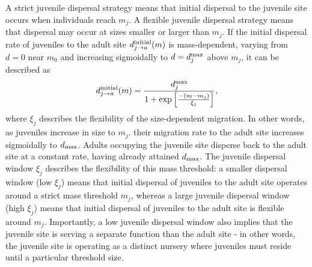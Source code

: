 \documentclass[]{rsos}%
\begin{document}
A strict juvenile dispersal strategy means that initial dispersal to the juvenile site occurs when individuals reach $m_j$.
A flexible juvenile dispersal strategy means that dispersal may occur at sizes smaller or larger than $m_j$.
If the initial dispersal rate of juveniles to the adult site $d_{j\rightarrow a}^{\rm initial}(m)$ is mass-dependent, varying from $d=0$ near $m_0$ and increasing sigmoidally to $d=d_j^{\rm max}$ above $m_j$, it can be described as
\begin{equation}
    d_{j\rightarrow a}^{\rm initial}(m) = \frac{d_j^{\rm max}}{1 + {\rm exp}\left[\frac{-(m - m_j)}{\xi_j}\right]},
\end{equation}
where $\xi_j$ describes the flexibility of the size-dependent migration.
In other words, as juveniles increase in size to $m_j$, their migration rate to the adult site increases sigmoidally to $d_{\rm max}$.
Adults occupying the juvenile site disperse back to the adult site at a constant rate, having already attained $d_{\rm max}$.
The juvenile dispersal window $\xi_j$ describes the flexibility of this mass threshold: a smaller dispersal window (low $\xi_j$) means that initial dispersal of juveniles to the adult site operates around a strict mass threshold $m_j$, whereas a large juvenile dispersal window (high $\xi_j$) means that initial dispersal of juveniles to the adult site is flexible around $m_j$.
Importantly, a low juvenile dispersal window also implies that the juvenile site is serving a separate function than the adult site - in other words, the juvenile site is operating as a distinct nursery where juveniles must reside until a particular threshold size.

\end{document}

